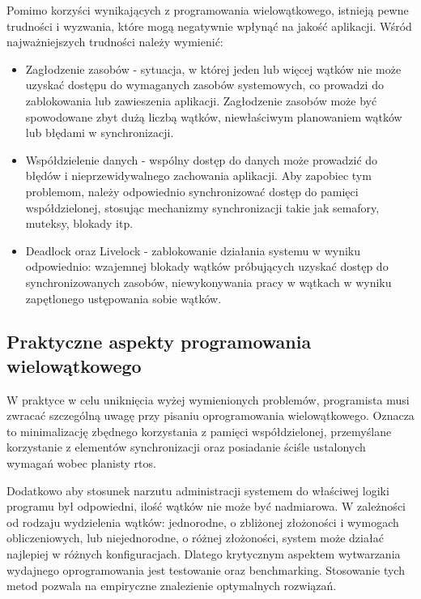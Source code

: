 Pomimo korzyści wynikających z programowania wielowątkowego, istnieją pewne trudności i wyzwania,
które mogą negatywnie wpłynąć na jakość aplikacji. Wśród najważniejszych trudności należy wymienić:
\begin{itemize}
      \item Zagłodzenie zasobów - sytuacja, w której jeden lub więcej wątków nie może uzyskać dostępu do wymaganych zasobów systemowych,
            co prowadzi do zablokowania lub zawieszenia aplikacji. Zagłodzenie zasobów może być spowodowane zbyt dużą liczbą wątków,
            niewłaściwym planowaniem wątków lub błędami w synchronizacji.
      \item Współdzielenie danych - wspólny dostęp do danych może prowadzić do błędów i nieprzewidywalnego zachowania aplikacji.
            Aby zapobiec tym problemom, należy odpowiednio synchronizować dostęp do pamięci współdzielonej, stosując mechanizmy synchronizacji
            takie jak semafory, muteksy, blokady itp.
      \item Deadlock oraz Livelock - zablokowanie działania systemu w wyniku odpowiednio:
            wzajemnej blokady wątków próbujących uzyskać dostęp do synchronizowanych zasobów,
            niewykonywania pracy w wątkach w wyniku zapętlonego ustępowania sobie wątków.
\end{itemize}

\subsection{Praktyczne aspekty programowania wielowątkowego}
W praktyce w celu uniknięcia wyżej wymienionych problemów, programista musi zwracać szczególną uwagę przy pisaniu
oprogramowania wielowątkowego. Oznacza to minimalizację zbędnego korzystania z pamięci współdzielonej, przemyślane korzystanie
z elementów synchronizacji oraz posiadanie ściśle ustalonych wymagań wobec planisty \gls{rtos}.

Dodatkowo aby stosunek narzutu administracji systemem do właściwej logiki programu był odpowiedni, ilość wątków nie może być nadmiarowa.
W zależności od rodzaju wydzielenia wątków: jednorodne, o zbliżonej złożoności i wymogach obliczeniowych, lub niejednorodne, o różnej złożoności,
system może działać najlepiej w różnych konfiguracjach. Dlatego krytycznym aspektem wytwarzania wydajnego oprogramowania jest testowanie oraz
\gls{benchmarking}. Stosowanie tych metod pozwala na empiryczne znalezienie optymalnych rozwiązań.

